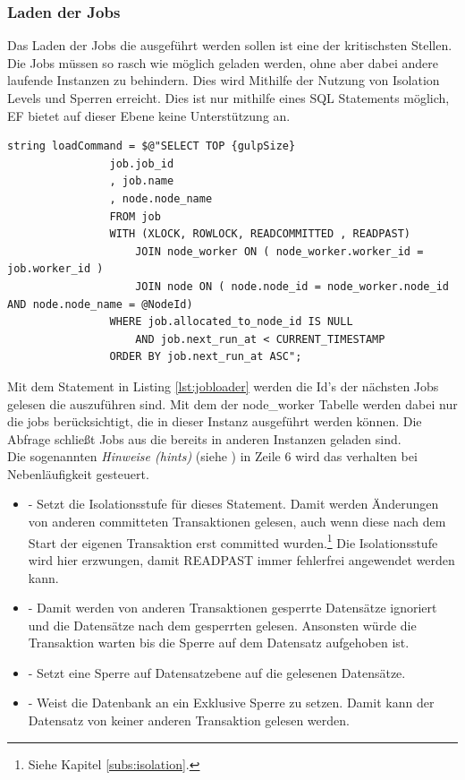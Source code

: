 \subsubsection{Laden der Jobs}
Das Laden der Jobs die ausgeführt werden sollen ist eine der kritischsten Stellen. Die Jobs müssen so rasch wie möglich geladen werden, ohne aber dabei andere laufende Instanzen zu behindern. Dies wird Mithilfe der Nutzung von Isolation Levels und Sperren erreicht. Dies ist nur mithilfe eines SQL Statements möglich, EF bietet auf dieser Ebene keine Unterstützung an.
\begin{lstlisting}[caption={Jobs Laden, siehe DefaultJobLoader.cs - DoLoad()},label={lst:jobloader},captionpos=b]
string loadCommand = $@"SELECT TOP {gulpSize}
				job.job_id
				, job.name
				, node.node_name
				FROM job
				WITH (XLOCK, ROWLOCK, READCOMMITTED , READPAST)
					JOIN node_worker ON ( node_worker.worker_id = job.worker_id )
					JOIN node ON ( node.node_id = node_worker.node_id AND node.node_name = @NodeId)
				WHERE job.allocated_to_node_id IS NULL
					AND job.next_run_at < CURRENT_TIMESTAMP
				ORDER BY job.next_run_at ASC";
\end{lstlisting}
Mit dem Statement in Listing \ref{lst:jobloader} werden die Id's der nächsten Jobs gelesen die auszuführen sind. Mit dem  der node\_worker Tabelle werden dabei nur die jobs berücksichtigt, die in dieser Instanz ausgeführt werden können. Die Abfrage  schließt Jobs aus die bereits in anderen Instanzen geladen sind. 
\\Die sogenannten \emph{Hinweise (hints)} (siehe \parencite{ms_hints}) in Zeile 6 wird das verhalten bei Nebenläufigkeit gesteuert.
\begin{itemize}
	\item {} - Setzt die Isolationsstufe für dieses Statement. Damit werden Änderungen von anderen committeten Transaktionen gelesen, auch wenn diese nach dem Start der eigenen Transaktion erst committed wurden.\footnote{Siehe Kapitel \ref{subs:isolation}.} Die Isolationsstufe wird hier erzwungen, damit READPAST immer fehlerfrei angewendet werden kann.
	\item {} - Damit werden von anderen Transaktionen gesperrte Datensätze ignoriert und die Datensätze nach dem gesperrten gelesen. Ansonsten würde die Transaktion warten bis die Sperre auf dem Datensatz aufgehoben ist.
	\item {} - Setzt eine Sperre auf Datensatzebene auf die gelesenen Datensätze.
	\item {} - Weist die Datenbank an ein Exklusive Sperre zu setzen. Damit kann der Datensatz von keiner anderen Transaktion gelesen werden.
\end{itemize}
